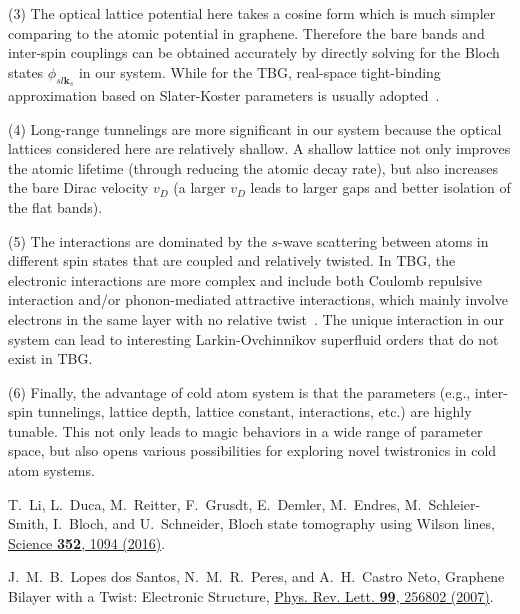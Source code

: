 \documentclass[twocolumn,english,prl,floatfix,citeautoscript,nofootinbib]{revtex4}
\begin{document}
\begin{widetext}
(3) The optical lattice potential here takes a cosine form which is much
simpler comparing to the atomic potential in graphene. Therefore the bare
bands and inter-spin couplings can be obtained accurately by directly
solving for the Bloch states $\phi _{sl\mathbf{k}_{s}}$ in our system. While
for the TBG, real-space tight-binding approximation based on Slater-Koster
parameters is usually adopted~\cite%
{PhysRevLett.99.256802S,PhysRevB.81.165105S}.

(4) Long-range tunnelings are more significant in our system because the
optical lattices considered here are relatively shallow. A shallow lattice
not only improves the atomic lifetime (through reducing the atomic decay
rate), but also increases the bare Dirac velocity $v_{D}$ (a larger $v_{D}$
leads to larger gaps and better isolation of the flat bands).

(5) The interactions are dominated by the $s$-wave scattering between atoms
in different spin states that are coupled and relatively twisted. In TBG,
the electronic interactions are more complex and include both Coulomb
repulsive interaction and/or phonon-mediated attractive interactions, which
mainly involve electrons in the same layer with no relative twist~\cite%
{PhysRevB.98.220504S,PhysRevLett.122.257002S,PhysRevLett.121.257001S,
PhysRevX.8.041041S,PhysRevLett.121.217001S,PhysRevLett.122.026801S}. The
unique interaction in our system can lead to interesting Larkin-Ovchinnikov
superfluid orders that do not exist in TBG.

(6) Finally, the advantage of cold atom system is that the parameters (e.g.,
inter-spin tunnelings, lattice depth, lattice constant, interactions, etc.)
are highly tunable. This not only leads to magic behaviors in a wide range
of parameter space, but also opens various possibilities for exploring novel
twistronics in cold atom systems.

\begin{thebibliography}{99}
 T.~Li, L.~Duca, M.~Reitter, F.~Grusdt, E.~Demler,
M.~Endres, M.~Schleier-Smith, I.~Bloch, and U.~Schneider, Bloch state
tomography using Wilson lines, \href{https://doi.org/10.1126/science.aad5812}%
{Science \textbf{352}, 1094 (2016)}.

 J.~M.~B.~Lopes dos Santos, N.~M.~R.~Peres,
and A.~H.~Castro Neto, Graphene Bilayer with a Twist: Electronic Structure,
\href{https://doi.org/10.1103/PhysRevLett.99.256802}{Phys. Rev. Lett.
\textbf{99}, 256802 (2007)}.


\end{thebibliography}
\end{widetext}
\end{document}
